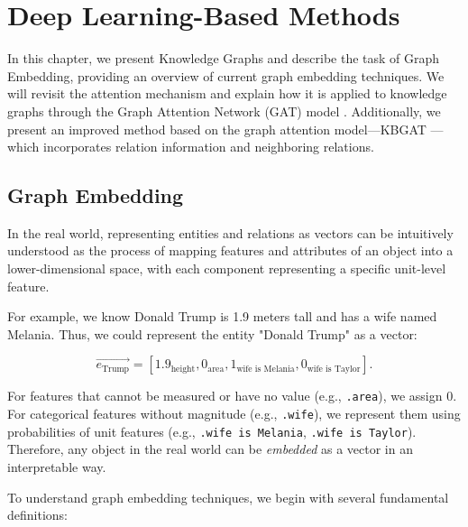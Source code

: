\chapter{Deep Learning-Based Methods}
\label{chap:DeeLearning}

In this chapter, we present Knowledge Graphs and describe the task of Graph Embedding, providing an overview of current graph embedding techniques. We will revisit the attention mechanism and explain how it is applied to knowledge graphs through the Graph Attention Network (GAT) model \cite{velivckovic2017graph}. Additionally, we present an improved method based on the graph attention model—KBGAT \cite{nathani2019learning}—which incorporates relation information and neighboring relations.

\section{Graph Embedding}
\label{sec:graphEmbedding}

In the real world, representing entities and relations as vectors can be intuitively understood as the process of mapping features and attributes of an object into a lower-dimensional space, with each component representing a specific unit-level feature.

For example, we know Donald Trump is 1.9 meters tall and has a wife named Melania. Thus, we could represent the entity "Donald Trump" as a vector:

\[
\overrightarrow{e_\text{Trump}} = [1.9_{\text{height}}, 0_{\text{area}}, 1_{\text{wife is Melania}}, 0_{\text{wife is Taylor}}].
\]

For features that cannot be measured or have no value (e.g., \texttt{.area}), we assign 0. For categorical features without magnitude (e.g., \texttt{.wife}), we represent them using probabilities of unit features (e.g., \texttt{.wife is Melania}, \texttt{.wife is Taylor}). Therefore, any object in the real world can be \textit{embedded} as a vector in an interpretable way.

To understand graph embedding techniques, we begin with several fundamental definitions:


